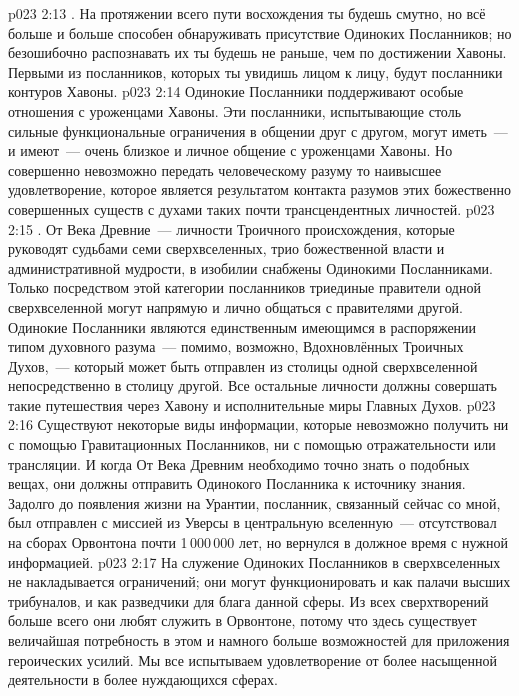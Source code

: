 \vs p023 2:13 . На протяжении всего пути восхождения ты будешь смутно, но всё больше и больше способен обнаруживать присутствие Одиноких Посланников; но безошибочно распознавать их ты будешь не раньше, чем по достижении Хавоны. Первыми из посланников, которых ты увидишь лицом к лицу, будут посланники контуров Хавоны.
\vs p023 2:14 Одинокие Посланники поддерживают особые отношения с уроженцами Хавоны. Эти посланники, испытывающие столь сильные функциональные ограничения в общении друг с другом, могут иметь~--- и имеют~--- очень близкое и личное общение с уроженцами Хавоны. Но совершенно невозможно передать человеческому разуму то наивысшее удовлетворение, которое является результатом контакта разумов этих божественно совершенных существ с духами таких почти трансцендентных личностей.
\vs p023 2:15 . От Века Древние~--- личности Троичного происхождения, которые руководят судьбами семи сверхвселенных, трио божественной власти и административной мудрости, в изобилии снабжены Одинокими Посланниками. Только посредством этой категории посланников триединые правители одной сверхвселенной могут напрямую и лично общаться с правителями другой. Одинокие Посланники являются единственным имеющимся в распоряжении типом духовного разума~--- помимо, возможно, Вдохновлённых Троичных Духов,~--- который может быть отправлен из столицы одной сверхвселенной непосредственно в столицу другой. Все остальные личности должны совершать такие путешествия через Хавону и исполнительные миры Главных Духов.
\vs p023 2:16 Существуют некоторые виды информации, которые невозможно получить ни с помощью Гравитационных Посланников, ни с помощью отражательности или трансляции. И когда От Века Древним необходимо точно знать о подобных вещах, они должны отправить Одинокого Посланника к источнику знания. Задолго до появления жизни на Урантии, посланник, связанный сейчас со мной, был отправлен с миссией из Уверсы в центральную вселенную~--- отсутствовал на сборах Орвонтона почти 1\,000\,000 лет, но вернулся в должное время с нужной информацией.
\vs p023 2:17 На служение Одиноких Посланников в сверхвселенных не накладывается ограничений; они могут функционировать и как палачи высших трибуналов, и как разведчики для блага данной сферы. Из всех сверхтворений больше всего они любят служить в Орвонтоне, потому что здесь существует величайшая потребность в этом и намного больше возможностей для приложения героических усилий. Мы все испытываем удовлетворение от более насыщенной деятельности в более нуждающихся сферах.
